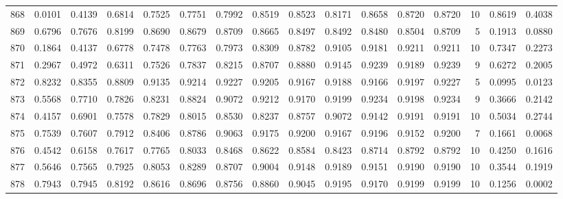 \begin{tabular}{lrrrrrrrrrrrrrrr}
868 &      0.0101 &  0.4139 &  0.6814 &  0.7525 &  0.7751 &  0.7992 &  0.8519 &  0.8523 &  0.8171 &  0.8658 &   0.8720 &     0.8720 &     10 &                    0.8619 &                     0.4038 \\
869 &      0.6796 &  0.7676 &  0.8199 &  0.8690 &  0.8679 &  0.8709 &  0.8665 &  0.8497 &  0.8492 &  0.8480 &   0.8504 &     0.8709 &      5 &                    0.1913 &                     0.0880 \\
870 &      0.1864 &  0.4137 &  0.6778 &  0.7478 &  0.7763 &  0.7973 &  0.8309 &  0.8782 &  0.9105 &  0.9181 &   0.9211 &     0.9211 &     10 &                    0.7347 &                     0.2273 \\
871 &      0.2967 &  0.4972 &  0.6311 &  0.7526 &  0.7837 &  0.8215 &  0.8707 &  0.8880 &  0.9145 &  0.9239 &   0.9189 &     0.9239 &      9 &                    0.6272 &                     0.2005 \\
872 &      0.8232 &  0.8355 &  0.8809 &  0.9135 &  0.9214 &  0.9227 &  0.9205 &  0.9167 &  0.9188 &  0.9166 &   0.9197 &     0.9227 &      5 &                    0.0995 &                     0.0123 \\
873 &      0.5568 &  0.7710 &  0.7826 &  0.8231 &  0.8824 &  0.9072 &  0.9212 &  0.9170 &  0.9199 &  0.9234 &   0.9198 &     0.9234 &      9 &                    0.3666 &                     0.2142 \\
874 &      0.4157 &  0.6901 &  0.7578 &  0.7829 &  0.8015 &  0.8530 &  0.8237 &  0.8757 &  0.9072 &  0.9142 &   0.9191 &     0.9191 &     10 &                    0.5034 &                     0.2744 \\
875 &      0.7539 &  0.7607 &  0.7912 &  0.8406 &  0.8786 &  0.9063 &  0.9175 &  0.9200 &  0.9167 &  0.9196 &   0.9152 &     0.9200 &      7 &                    0.1661 &                     0.0068 \\
876 &      0.4542 &  0.6158 &  0.7617 &  0.7765 &  0.8033 &  0.8468 &  0.8622 &  0.8584 &  0.8423 &  0.8714 &   0.8792 &     0.8792 &     10 &                    0.4250 &                     0.1616 \\
877 &      0.5646 &  0.7565 &  0.7925 &  0.8053 &  0.8289 &  0.8707 &  0.9004 &  0.9148 &  0.9189 &  0.9151 &   0.9190 &     0.9190 &     10 &                    0.3544 &                     0.1919 \\
878 &      0.7943 &  0.7945 &  0.8192 &  0.8616 &  0.8696 &  0.8756 &  0.8860 &  0.9045 &  0.9195 &  0.9170 &   0.9199 &     0.9199 &     10 &                    0.1256 &                     0.0002 \\

\end{tabular}
